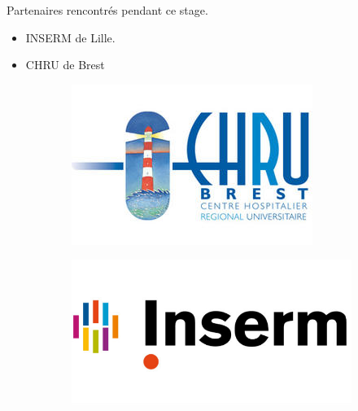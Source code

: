 \documentclass{beamer}
\begin{document}
\begin{frame}

Partenaires rencontrés pendant ce stage.

\begin{itemize}
\item INSERM de Lille.
\item CHRU de Brest
\end{itemize}

\begin{figure}
\centering
\begin{subfigure}[t]{0.5\textwidth}
\centering
    \vspace{0.00\textheight}
    \includegraphics[scale=0.4,angle=0]{c34c9da0e3.jpg}
    \label{fig:CHRU} 
\end{subfigure}
\begin{subfigure}[t]{0.5\textwidth}
\centering
    \vspace{0.00\textheight}
    \includegraphics[scale=0.2,angle=0]{inserm_logo.jpg}
    \label{fig:Inserm} 
\end{subfigure}
    \label{fig:Partenaires} 
\end{figure}

\end{frame}



\end{document}
